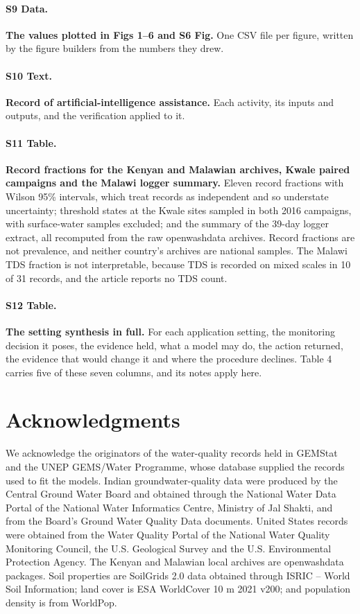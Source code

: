 \documentclass[10pt,letterpaper]{article}
\begin{document}
\paragraph*{S9 Data.}
\label{S9_Data}
\textbf{The values plotted in Figs 1--6 and S6 Fig.} One CSV file per figure, written by the figure builders from the numbers they drew.

\paragraph*{S10 Text.}
\label{S10_Text}
\textbf{Record of artificial-intelligence assistance.} Each activity, its inputs and outputs, and the verification applied to it.

\paragraph*{S11 Table.}
\label{S11_Table}
\textbf{Record fractions for the Kenyan and Malawian archives, Kwale paired campaigns and the Malawi
logger summary.} Eleven record fractions with Wilson 95\% intervals, which treat records as independent and so understate uncertainty; threshold states at the Kwale sites sampled in both 2016 campaigns, with surface-water samples excluded; and the summary of the 39-day logger extract, all recomputed from the raw openwashdata archives. Record fractions are not prevalence, and neither country's archives are national samples. The Malawi TDS fraction is not interpretable, because TDS is recorded on mixed scales in 10 of 31 records, and the article reports no TDS count.

\paragraph*{S12 Table.}
\label{S12_Table}
\textbf{The setting synthesis in full.} For each application setting, the monitoring decision it poses, the evidence held, what a model may do, the action returned, the evidence that would change it and where the procedure declines. Table 4 carries five of these seven columns, and its notes apply here.

\section*{Acknowledgments}

We acknowledge the originators of the water-quality records held in GEMStat and the UNEP GEMS/Water Programme, whose database supplied the records used to fit the models. Indian groundwater-quality data were produced by the Central Ground Water Board and obtained through the National Water Data Portal of the National Water Informatics Centre, Ministry of Jal Shakti, and from the Board's Ground Water Quality Data documents. United States records were obtained from the Water Quality Portal of the National Water Quality Monitoring Council, the U.S. Geological Survey and the U.S. Environmental Protection Agency. The Kenyan and Malawian local archives are openwashdata packages. Soil properties are SoilGrids 2.0 data obtained through ISRIC -- World Soil Information; land cover is ESA WorldCover 10 m 2021 v200; and population density is from WorldPop.
\end{document}
